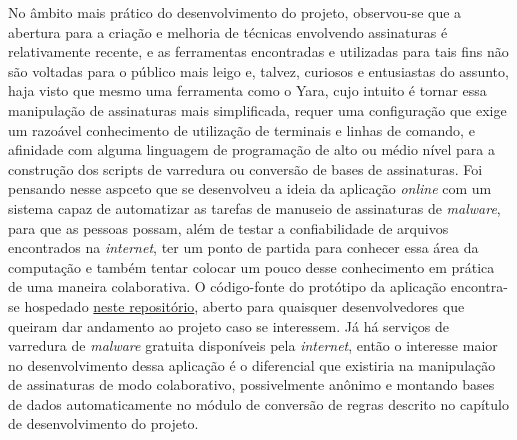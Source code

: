 No âmbito mais prático do desenvolvimento do projeto, observou-se que a abertura
para a criação e melhoria de técnicas envolvendo assinaturas é relativamente
recente, e as ferramentas encontradas e utilizadas para tais fins não são
voltadas para o público mais leigo e, talvez, curiosos e entusiastas do assunto,
haja visto que mesmo uma ferramenta como o Yara, cujo intuito é tornar essa
manipulação de assinaturas mais simplificada, requer uma configuração que exige
um razoável conhecimento de utilização de terminais e linhas de comando, e
afinidade com alguma linguagem de programação de alto ou médio nível para a
construção dos scripts de varredura ou conversão de bases de assinaturas. Foi
pensando nesse aspceto que se desenvolveu a ideia da aplicação \textit{online}
com um sistema capaz de automatizar as tarefas de manuseio de assinaturas de
\textit{malware}, para que as pessoas possam, além de testar a confiabilidade de
arquivos encontrados na \textit{internet}, ter um ponto de partida para conhecer
essa área da computação e também tentar colocar um pouco desse conhecimento em
prática de uma maneira colaborativa. O código-fonte do protótipo da aplicação
encontra-se hospedado \href{https://github.com/ltgouvea/TCC }{neste
repositório},  aberto para quaisquer desenvolvedores que queiram dar andamento
ao projeto caso se interessem. Já há serviços de varredura de \textit{malware}
gratuita disponíveis pela \textit{internet}, então o interesse maior no
desenvolvimento dessa aplicação é o diferencial que existiria na manipulação de
assinaturas de modo colaborativo, possivelmente anônimo e montando bases de
dados automaticamente no módulo de conversão de regras descrito no capítulo de
desenvolvimento do projeto.
